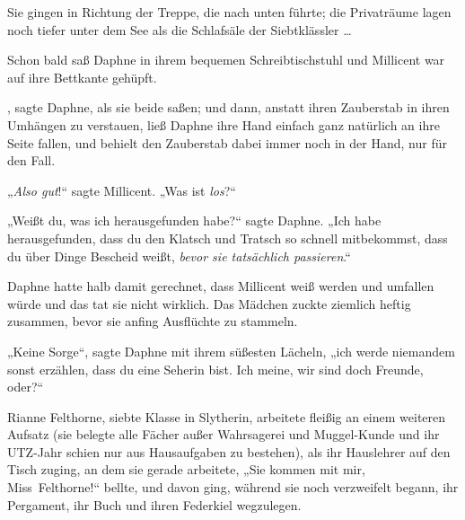 Sie gingen in Richtung der Treppe, die nach unten führte; die Privaträume lagen noch tiefer unter dem See als die Schlafsäle der Siebtklässler …

Schon bald saß Daphne in ihrem bequemen Schreibtischstuhl und Millicent war auf ihre Bettkante gehüpft.

, sagte Daphne, als sie beide saßen; und dann, anstatt ihren Zauberstab in ihren Umhängen zu verstauen, ließ Daphne ihre Hand einfach ganz natürlich an ihre Seite fallen, und behielt den Zauberstab dabei immer noch in der Hand, nur für den Fall.

„\emph{Also gut}!“ sagte Millicent.
„Was ist \emph{los}?“

„Weißt du, was ich herausgefunden habe?“ sagte Daphne.
„Ich habe herausgefunden, dass du den Klatsch und Tratsch so schnell mitbekommst, dass du über Dinge Bescheid weißt, \emph{bevor sie tatsächlich passieren}.“

Daphne hatte halb damit gerechnet, dass Millicent weiß werden und umfallen würde und das tat sie nicht wirklich. Das Mädchen zuckte ziemlich heftig zusammen, bevor sie anfing Ausflüchte zu stammeln.

„Keine Sorge“, sagte Daphne mit ihrem süßesten Lächeln, „ich werde niemandem sonst erzählen, dass du eine Seherin bist. Ich meine, wir sind doch Freunde, oder?“

\later

Rianne Felthorne, siebte Klasse in Slytherin, arbeitete fleißig an einem weiteren Aufsatz (sie belegte alle Fächer außer Wahrsagerei und Muggel-Kunde und ihr UTZ-Jahr schien nur aus Hausaufgaben zu bestehen), als ihr Hauslehrer auf den Tisch zuging, an dem sie gerade arbeitete,
„Sie kommen mit mir, Miss~Felthorne!“ bellte, und davon ging, während sie noch verzweifelt begann, ihr Pergament, ihr Buch und ihren Federkiel wegzulegen.

